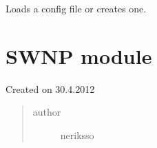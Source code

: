 \documentclass[letterpaper,10pt,english]{sphinxmanual}
\begin{document}
\begin{fulllineitems}
\label{state:state.load_config}
Loads a config file or creates one.

\end{fulllineitems}



\section{SWNP module}
\label{swnp::doc}\label{swnp:swnp-module}\label{swnp:module-swnp}
Created on 30.4.2012
\begin{quote}\begin{description}
\item[{author}] \leavevmode
neriksso

\end{description}\end{quote}
\end{document}
